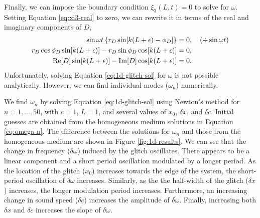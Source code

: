 Finally, we can impose the boundary condition \(\xi_3(L, t) = 0\) to solve for \(\omega\). Setting Equation \ref{eq:xi3-real} to zero, we can rewrite it in terms of the real and imaginary components of \(D\),
%
\begin{align}
    \sin \omega t \left\{r_D \sin[k(L + \epsilon) - \phi_D]\right\} &= 0, \quad (\div \sin \omega t) \notag \\
    r_D \cos \phi_D \sin[k(L + \epsilon)] - r_D \sin \phi_D \cos[k(L + \epsilon)] &= 0, \notag \\
    {\mathrm{Re}}[D] \sin[k(L + \epsilon)] - {\mathrm{Im}}[D] \cos[k(L + \epsilon)] &=0. \label{eq:1d-glitch-sol}
\end{align}
%
Unfortunately, solving Equation \ref{eq:1d-glitch-sol} for \(\omega\) is not possible analytically. However, we can find individual modes (\(\omega_n\)) numerically.

We find \(\omega_n\) by solving Equation \ref{eq:1d-glitch-sol} using Newton's method for \(n = 1,\dots,50\), with \(c=1\), \(L=1\), and several values of \(x_0\), \(\delta x\), and \(\delta c\). Initial guesses are obtained from the homogeneous medium solutions in Equation \ref{eq:omega-n}. The difference between the solutions for \(\omega_n\) and those from the homogeneous medium are shown in Figure \ref{fig:1d-results}. We can see that the change in frequency (\(\delta \omega\)) induced by the glitch oscillates. There appears to be a linear component and a short period oscillation modulated by a longer period. As the location of the glitch (\(x_0\)) increases towards the edge of the system, the short-period oscillation of \(\delta\omega\) increases. Similarly, as the the half-width of the glitch (\(\delta x\)) increases, the longer modulation period increases. Furthermore, an increasing change in sound speed (\(\delta c\)) increases the amplitude of \(\delta\omega\). Finally, increasing both \(\delta x\) and \(\delta c\) increases the slope of \(\delta\omega\).

